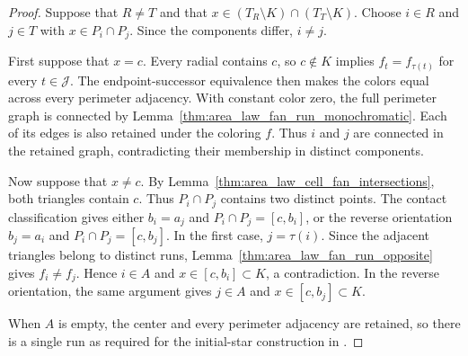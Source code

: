 \begin{proof}\leanok
    Suppose that $R\ne T$ and that
    $x\in(T_R\setminus K)\cap(T_T\setminus K)$.
    Choose $i\in R$ and $j\in T$ with $x\in P_i\cap P_j$.
    Since the components differ, $i\ne j$.

    First suppose that $x=c$.
    Every radial contains $c$, so $c\notin K$ implies
    $f_t=f_{\tau(t)}$ for every $t\in\mathcal J$.
    The endpoint-successor equivalence then makes the colors equal
    across every perimeter adjacency.
    With constant color zero, the full perimeter graph is connected
    by Lemma~\ref{thm:area_law_fan_run_monochromatic}.
    Each of its edges is also retained under the coloring $f$.
    Thus $i$ and $j$ are connected in the retained graph, contradicting
    their membership in distinct components.

    Now suppose that $x\ne c$.
    By Lemma~\ref{thm:area_law_cell_fan_intersections}, both triangles
    contain $c$. Thus $P_i\cap P_j$ contains two distinct points.
    The contact classification gives either
    $b_i=a_j$ and $P_i\cap P_j=[c,b_i]$, or the reverse orientation
    $b_j=a_i$ and $P_i\cap P_j=[c,b_j]$.
    In the first case, $j=\tau(i)$.
    Since the adjacent triangles belong to distinct runs,
    Lemma~\ref{thm:area_law_fan_run_opposite} gives $f_i\ne f_j$.
    Hence $i\in A$ and $x\in[c,b_i]\subset K$, a contradiction.
    In the reverse orientation, the same argument gives $j\in A$
    and $x\in[c,b_j]\subset K$.

    When $A$ is empty, the center and every perimeter adjacency are
    retained, so there is a single run as required for the initial-star
    construction in \cite[Section~11]{OpenAI2026AreaLaw}.
\end{proof}
